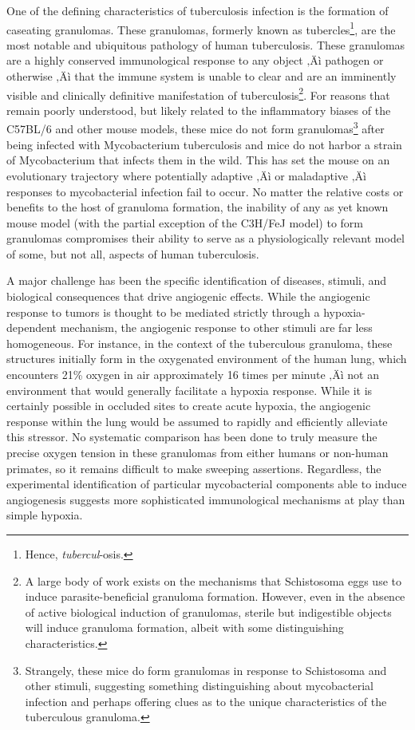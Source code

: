 One of the defining characteristics of tuberculosis infection is the formation of caseating granulomas. These granulomas, formerly known as tubercles\footnote{Hence, \textit{tubercul}-osis.}, are the most notable and ubiquitous pathology of human tuberculosis. These granulomas are a highly conserved immunological response to any object ‚Äì pathogen or otherwise ‚Äì that the immune system is unable to clear and are an imminently visible and clinically definitive manifestation of tuberculosis\footnote{A large body of work exists on the mechanisms that Schistosoma eggs use to induce parasite-beneficial granuloma formation. However, even in the absence of active biological induction of granulomas, sterile but indigestible objects will induce granuloma formation, albeit with some distinguishing characteristics.}. For reasons that remain poorly understood, but likely related to the inflammatory biases of the C57BL/6 and other mouse models, these mice do not form granulomas\footnote{Strangely, these mice do form granulomas in response to Schistosoma and other stimuli, suggesting something distinguishing about mycobacterial infection and perhaps offering clues as to the unique characteristics of the tuberculous granuloma.} after being infected with Mycobacterium tuberculosis and mice do not harbor a strain of Mycobacterium that infects them in the wild. This has set the mouse on an evolutionary trajectory where potentially adaptive ‚Äì or maladaptive ‚Äì responses to mycobacterial infection fail to occur. No matter the relative costs or benefits to the host of granuloma formation, the inability of any as yet known mouse model (with the partial exception of the C3H/FeJ model) to form granulomas compromises their ability to serve as a physiologically relevant model of some, but not all, aspects of human tuberculosis.

A major challenge has been the specific identification of diseases, stimuli, and biological consequences that drive angiogenic effects. While the angiogenic response to tumors is thought to be mediated strictly through a hypoxia-dependent mechanism, the angiogenic response to other stimuli are far less homogeneous. For instance, in the context of the tuberculous granuloma, these structures initially form in the oxygenated environment of the human lung, which encounters 21\% oxygen in air approximately 16 times per minute ‚Äì not an environment that would generally facilitate a hypoxia response. While it is certainly possible in occluded sites to create acute hypoxia, the angiogenic response within the lung would be assumed to rapidly and efficiently alleviate this stressor. No systematic comparison has been done to truly measure the precise oxygen tension in these granulomas from either humans or non-human primates, so it remains difficult to make sweeping assertions. Regardless, the experimental identification of particular mycobacterial components able to induce angiogenesis suggests more sophisticated immunological mechanisms at play than simple hypoxia.

